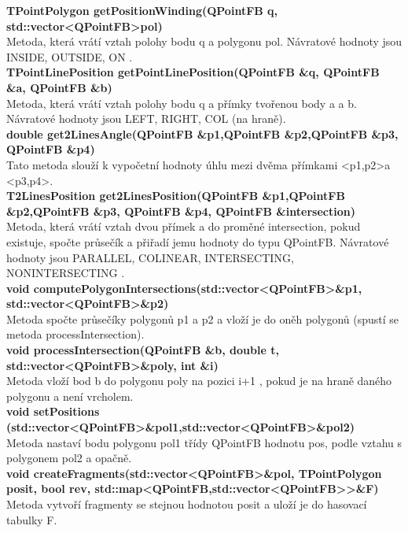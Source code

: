 \documentclass[a4paper, 12pt]{article}
\begin{document}
\textbf{TPointPolygon getPositionWinding(QPointFB q, std::vector\textless QPointFB\textgreater pol)}\\
Metoda, která vrátí vztah polohy bodu q a polygonu pol. Návratové hodnoty jsou INSIDE, OUTSIDE, ON .\\

\textbf{TPointLinePosition getPointLinePosition(QPointFB \&q, QPointFB \&a, QPointFB \&b)}\\
Metoda, která vrátí vztah polohy bodu q a přímky tvořenou body a a b. Návratové hodnoty jsou LEFT, RIGHT, COL (na hraně).\\

\textbf{double get2LinesAngle(QPointFB \&p1,QPointFB \&p2,QPointFB \&p3, QPointFB \&p4)}\\
Tato metoda slouží k vypočetní hodnoty úhlu mezi dvěma přímkami \textless p1,p2\textgreater a \textless p3,p4\textgreater .\\

\textbf{T2LinesPosition get2LinesPosition(QPointFB \&p1,QPointFB \&p2,QPointFB \&p3, QPointFB \&p4, QPointFB \&intersection)}\\
Metoda, která vrátí vztah dvou přímek a do proměné intersection, pokud existuje, spočte průsečík a přiřadí jemu hodnoty do typu QPointFB. Návratové hodnoty jsou PARALLEL, COLINEAR, INTERSECTING, NONINTERSECTING .\\


\textbf{void computePolygonIntersections(std::vector\textless QPointFB\textgreater \&p1, \\
std::vector\textless QPointFB\textgreater \&p2)}\\
Metoda spočte průsečíky polygonů p1 a p2 a vloží je do oněh polygonů (spustí se metoda processIntersection).\\

\textbf{void processIntersection(QPointFB \&b, double t, std::vector\textless QPointFB\textgreater \&poly, int \&i)}\\
Metoda vloží bod b do polygonu poly na pozici i+1 , pokud je na hraně daného polygonu a není vrcholem.\\

\textbf{void setPositions (std::vector\textless QPointFB\textgreater \&pol1,std::vector\textless QPointFB\textgreater \&pol2)}\\
Metoda nastaví bodu polygonu pol1 třídy QPointFB hodnotu pos, podle vztahu s polygonem pol2 a opačně.\\

\textbf{void createFragments(std::vector\textless QPointFB\textgreater \&pol, TPointPolygon posit, bool rev, std::map\textless QPointFB,std::vector\textless QPointFB\textgreater \textgreater  \&F)}\\
Metoda vytvoří fragmenty se stejnou hodnotou posit a uloží je do hasovací tabulky F.\\
\end{document}
